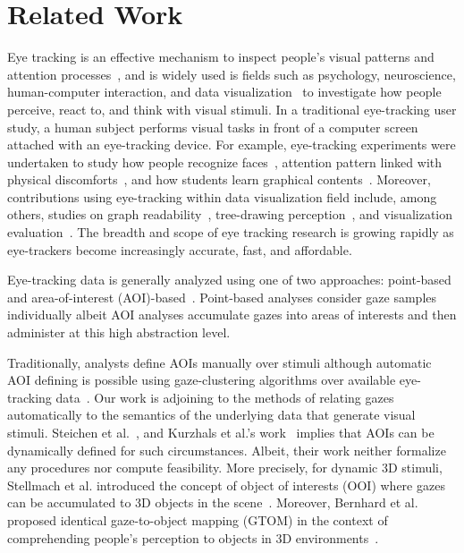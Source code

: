 \section{Related Work}
Eye tracking is an effective mechanism to inspect people's visual patterns and attention processes~\cite{jacob1991use}, and is widely used is fields such as psychology, neuroscience, human-computer interaction, and data visualization~\cite{duchowski2002breadth} to investigate how people perceive, react to, and think with visual stimuli. In a traditional eye-tracking user study, a human subject performs visual tasks in front of a computer screen attached with an eye-tracking device. For example, eye-tracking experiments were undertaken to study how people recognize faces~\cite{guo2014perceiving}, attention pattern linked with physical discomforts~\cite{vervoort2013attentional}, and how students learn graphical contents~\cite{mayer2010unique}. Moreover, contributions using eye-tracking within data visualization field include, among others, studies on graph readability~\cite{pohl2009comparing, huang2008beyond, huang2005people}, tree-drawing perception~\cite{burch2011evaluation, burch2013visual}, and visualization evaluation~\cite{kim2012does}.  The breadth and scope of eye tracking research is growing rapidly as eye-trackers become increasingly accurate, fast, and affordable.  

Eye-tracking data is generally analyzed using one of two approaches: point-based and area-of-interest (AOI)-based~\cite{blascheck2014state}. Point-based analyses consider gaze samples individually albeit AOI analyses accumulate gazes into areas of interests and then administer at this high abstraction level. 

Traditionally, analysts define AOIs manually over stimuli although automatic AOI defining is possible using gaze-clustering algorithms over available eye-tracking data~\cite{privitera2000algorithms, santella2004robust, drusch2014analysing}. Our work is adjoining to the methods of relating gazes automatically to the semantics of the underlying data that generate visual stimuli. Steichen et al.~\cite{steichen2013user}, and Kurzhals et al.'s work~\cite{kurzhals2014iseecube} implies that AOIs can be dynamically defined for such circumstances. Albeit, their work neither formalize any procedures nor compute feasibility. More precisely, for dynamic 3D stimuli, Stellmach et al. introduced the concept of object of interests (OOI) where gazes can be accumulated to 3D objects in the scene~\cite{stellmach20103d}. Moreover, Bernhard et al. proposed identical gaze-to-object mapping (GTOM) in the context of comprehending people's perception to objects in 3D environments~\cite{bernhard2014gaze}. 

